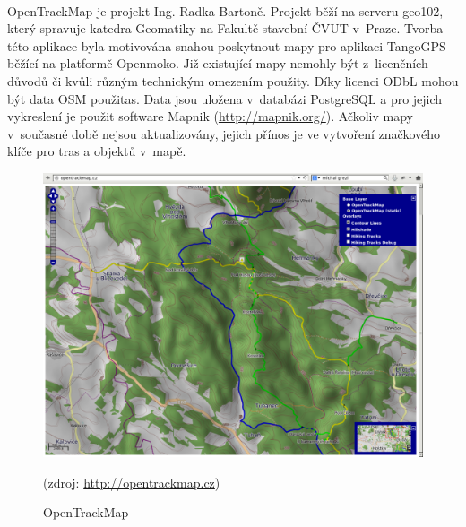 \documentclass[11pt,a4paper,titlepage,oneside]{book}
\begin{document}
                

		\paragraph{} OpenTrackMap je projekt Ing. Radka Bartoně. Projekt běží na serveru geo102, který spravuje katedra Geomatiky na Fakultě stavební ČVUT v~Praze. Tvorba této aplikace byla motivována snahou poskytnout mapy pro aplikaci TangoGPS běžící na platformě Openmoko\cite{OTM}. Již existující mapy nemohly být z~licenčních důvodů či kvůli různým technickým omezením použity. Díky licenci \ac{ODbL} mohou být data \ac{OSM} použitas. Data jsou uložena v~databázi PostgreSQL a pro jejich vykreslení je použit software Mapnik (\url{http://mapnik.org/}). Ačkoliv mapy v~současné době nejsou aktualizovány, jejich přínos je ve vytvoření značkového klíče pro tras a objektů v~mapě\cite{otm_klic}. 

		\begin{figure}[!h]
			\begin{center}
				\includegraphics[width=12cm]{obrazky/otm.png}
				\caption{OpenTrackMap}
				(zdroj: \url{http://opentrackmap.cz})
			\end{center}
		\end{figure}

\end{document}
